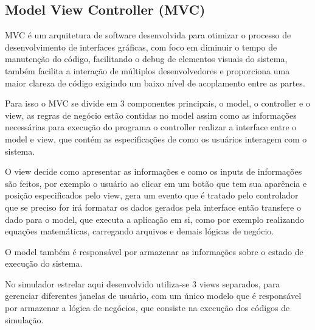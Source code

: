 \subsection{Model View Controller (MVC)}
MVC é um arquitetura de software desenvolvida para otimizar o processo de desenvolvimento de interfaces gráficas, com foco em diminuir o tempo de manutenção do código, facilitando o debug de elementos visuais do sistema, também facilita a interação de múltiplos desenvolvedores e proporciona uma maior clareza de código exigindo um baixo nível de acoplamento entre as partes. 

Para isso o MVC se divide em 3 componentes principais, o model, o controller e o view, as regras de negócio estão contidas no model assim como as informações  necessárias para execução do programa o controller realizar a interface entre o model e view, que contém as especificações de como os usuários interagem com o sistema.

O view decide como apresentar as informações e como os inputs de informações são feitos, por exemplo o usuário ao clicar em um botão que tem sua aparência e posição especificados pelo view, gera um evento que é tratado pelo controlador que se preciso for irá formatar os dados gerados pela interface então transfere o dado para o model, que executa a aplicação em si, como por exemplo realizando equações matemáticas, carregando arquivos e demais lógicas de negócio.

O model também é responsável por armazenar as informações sobre o estado de execução do sistema.

No simulador estrelar aqui desenvolvido utiliza-se 3 views separados, para gerenciar diferentes janelas de usuário, com um único modelo que é responsável por armazenar a lógica de negócios, que consiste na execução dos códigos de simulação.
